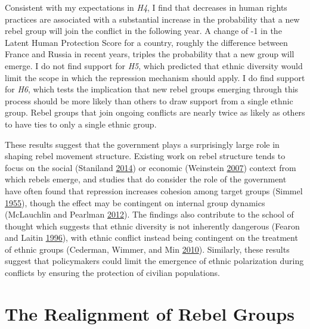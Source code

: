 \documentclass[12pt,]{book}
\theoremstyle{definition}
\theoremstyle{definition}
\theoremstyle{definition}
\theoremstyle{remark}
\begin{document}
Consistent with my expectations in \emph{H4}, I find that decreases in
human rights practices are associated with a substantial increase in the
probability that a new rebel group will join the conflict in the
following year. A change of -1 in the Latent Human Protection Score for
a country, roughly the difference between France and Russia in recent
years, triples the probability that a new group will emerge. I do not
find support for \emph{H5}, which predicted that ethnic diversity would
limit the scope in which the repression mechanism should apply. I do
find support for \emph{H6}, which tests the implication that new rebel
groups emerging through this process should be more likely than others
to draw support from a single ethnic group. Rebel groups that join
ongoing conflicts are nearly twice as likely as others to have ties to
only a single ethnic group.

These results suggest that the government plays a surprisingly large
role in shaping rebel movement structure. Existing work on rebel
structure tends to focus on the social (Staniland
\protect\hyperlink{ref-Staniland2014}{2014}) or economic (Weinstein
\protect\hyperlink{ref-Weinstein2007}{2007}) context from which rebels
emerge, and studies that do consider the role of the government have
often found that repression increases cohesion among target groups
(Simmel \protect\hyperlink{ref-Simmel1955}{1955}), though the effect may
be contingent on internal group dynamics (McLauchlin and Pearlman
\protect\hyperlink{ref-McLauchlin2012}{2012}). The findings also
contribute to the school of thought which suggests that ethnic diversity
is not inherently dangerous (Fearon and Laitin
\protect\hyperlink{ref-Fearon1996}{1996}), with ethnic conflict instead
being contingent on the treatment of ethnic groups (Cederman, Wimmer,
and Min \protect\hyperlink{ref-Cederman2010}{2010}). Similarly, these
results suggest that policymakers could limit the emergence of ethnic
polarization during conflicts by ensuring the protection of civilian
populations.

\hypertarget{realignment}{%
\chapter{The Realignment of Rebel Groups}\label{realignment}}
\end{document}
